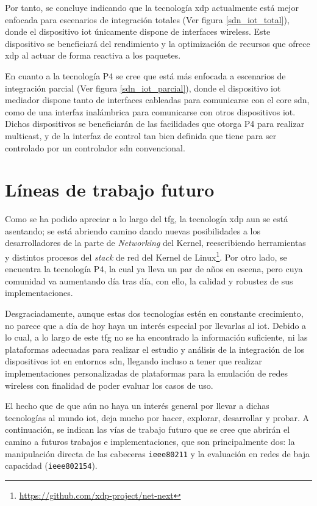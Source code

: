 Por tanto, se concluye indicando que la tecnología \gls{xdp} actualmente está mejor enfocada para escenarios de integración totales (Ver figura \ref{sdn_iot_total}), donde el dispositivo \gls{iot} únicamente dispone de interfaces wireless. Este dispositivo se beneficiará del rendimiento y la optimización de recursos que ofrece \gls{xdp} al actuar de forma reactiva a los paquetes. \\
\par
En cuanto a la tecnología P4 se cree que está más enfocada a escenarios de integración parcial (Ver figura \ref{sdn_iot_parcial}), donde el dispositivo \gls{iot} mediador dispone tanto de interfaces cableadas para comunicarse con el core \gls{sdn}, como de una interfaz inalámbrica para comunicarse con otros dispositivos \gls{iot}. Dichos dispositivos se beneficiarán de las facilidades que otorga P4 para realizar multicast, y de la interfaz de control tan bien definida que tiene para ser controlado por un controlador \gls{sdn} convencional.
\vspace{2cm}




\newpage
\section{Líneas de trabajo futuro}
\label{trabajoFuturo}

Como se ha podido apreciar a lo largo del \gls{tfg}, la tecnología \gls{xdp} aun se está asentando; se está abriendo camino dando nuevas posibilidades a los desarrolladores de la parte de \textit{Networking} del Kernel, reescribiendo herramientas y distintos procesos del \textit{stack} de red del Kernel de Linux\footnote{\url{https://github.com/xdp-project/net-next}}. Por otro lado, se encuentra la tecnología P4, la cual ya lleva un par de años en escena, pero cuya comunidad va aumentando día tras día,  con ello, la calidad y robustez de sus implementaciones.   \\
\par
Desgraciadamente, aunque estas dos tecnologías estén en constante crecimiento, no parece que a día de hoy haya un interés especial por llevarlas al \gls{iot}. Debido a lo cual, a lo largo de este \gls{tfg} no se ha encontrado la información suficiente, ni las plataformas adecuadas para realizar el estudio y análisis de la integración de los dispositivos \gls{iot} en entornos \gls{sdn}, llegando incluso a tener que realizar implementaciones personalizadas de plataformas para la emulación de redes wireless con finalidad de poder evaluar los casos de uso. \\
\par
El hecho que de que aún no haya un interés general por llevar a dichas tecnologías al mundo \gls{iot}, deja mucho por hacer, explorar, desarrollar y probar. A continuación, se indican las vías de trabajo futuro que se cree que abrirán el camino a futuros trabajos e implementaciones, que son principalmente dos: la manipulación directa de las cabeceras \texttt{ieee80211} y la evaluación en redes de baja capacidad (\texttt{ieee802154}).
